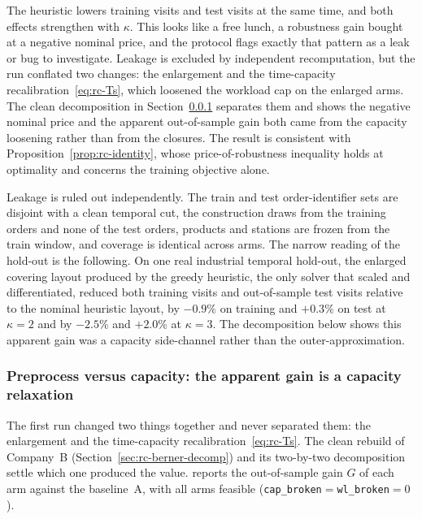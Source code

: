 \documentclass[preprint,review,11pt,authoryear]{elsarticle}
\begin{document}
The heuristic lowers training visits and test visits at the same time, and both effects strengthen with $\kappa$. This looks like a free lunch, a robustness gain bought at a negative nominal price, and the protocol flags exactly that pattern as a leak or bug to investigate. Leakage is excluded by independent recomputation, but the run conflated two changes: the enlargement and the time-capacity recalibration~\eqref{eq:rc-Ts}, which loosened the workload cap on the enlarged arms. The clean decomposition in Section~\ref{sec:rc-berner-decomp-res} separates them and shows the negative nominal price and the apparent out-of-sample gain both came from the capacity loosening rather than from the closures. The result is consistent with Proposition~\ref{prop:rc-identity}, whose price-of-robustness inequality holds at optimality and concerns the training objective alone.

Leakage is ruled out independently. The train and test order-identifier sets are disjoint with a clean temporal cut, the construction draws from the training orders and none of the test orders, products and stations are frozen from the train window, and coverage is identical across arms. The narrow reading of the hold-out is the following. On one real industrial temporal hold-out, the enlarged covering layout produced by the greedy heuristic, the only solver that scaled and differentiated, reduced both training visits and out-of-sample test visits relative to the nominal heuristic layout, by $-0.9\%$ on training and $+0.3\%$ on test at $\kappa=2$ and by $-2.5\%$ and $+2.0\%$ at $\kappa=3$. The decomposition below shows this apparent gain was a capacity side-channel rather than the outer-approximation.

\subsubsection{Preprocess versus capacity: the apparent gain is a capacity relaxation}\label{sec:rc-berner-decomp-res}

The first run changed two things together and never separated them: the enlargement and the time-capacity recalibration~\eqref{eq:rc-Ts}. The clean rebuild of Company~B (Section~\ref{sec:rc-berner-decomp}) and its two-by-two decomposition settle which one produced the value.  reports the out-of-sample gain $G$ of each arm against the baseline~A, with all arms feasible (\texttt{cap\_broken}$=$\texttt{wl\_broken}$=0$).
\end{document}
